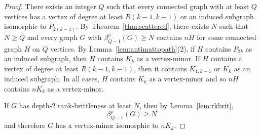 \documentclass[11pt]{article}
\begin{document}
        \begin{proof}
          There exists an integer $Q$ such that 
          every connected graph with at least $Q$ vertices
          has a vertex of degree at least $R(k-1,k-1)$
          or an induced subgraph isomorphic to $P_{2(k-1)}$.
          By Theorem~\ref{thm:scattered},
          there exists $N$ such that
          $N\ge Q$ and 
          every graph $G$ with $\beta^\rho_{Q-1}(G)\ge N$
          contains $nH$  for some connected graph $H$ on $Q$ vertices.
          By Lemma~\ref{lem:antimattopath}(2),
          if $H$ contains $P_{2k}$ as an induced subgraph, then $H$ contains $K_k$
          as a vertex-minor.
          If $H$ contains a vertex of degree at least $R(k-1,k-1)$, then it contains
          $K_{1,k-1}$ or $K_{k}$ as an induced subgraph.
          In all cases, $H$ contains $K_k$ as a vertex-minor and so
          $nH$ contains $nK_k$ as a vertex-minor.

          If $G$ has depth-$2$ rank-brittleness at least $N$,
          then by Lemma~\ref{lem:rkbrit},
          \[\beta^\rho_{Q-1}(G)\ge N\]
          and therefore $G$ has a vertex-minor isomorphic to $nK_k$.
        \end{proof}
\end{document}
